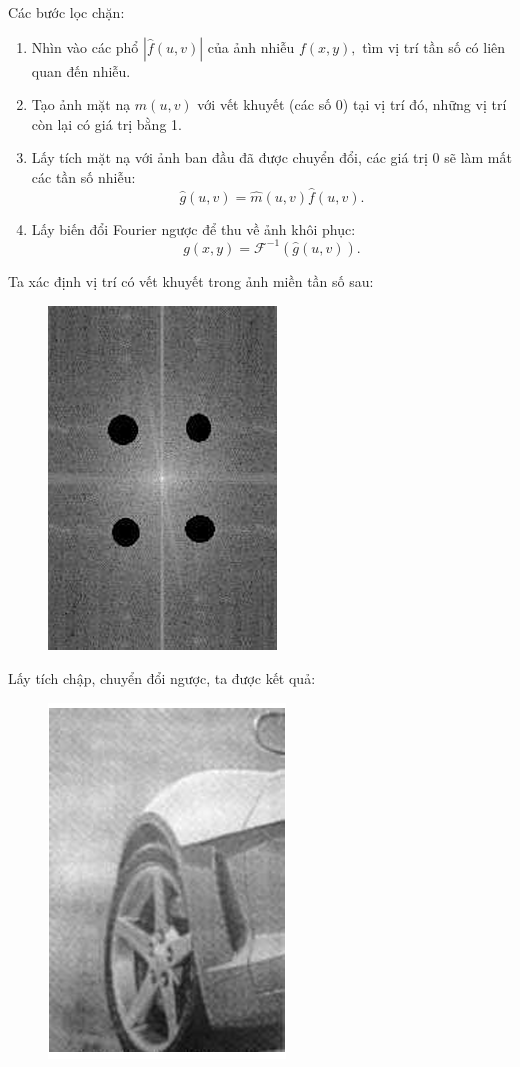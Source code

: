 \documentclass[12pt,a4paper]{report}
\numberwithin{equation}{section}
\theoremstyle{definition} %
\begin{document}
Các bước lọc chặn:
\begin{enumerate}
    \item Nhìn vào các phổ $|\hat{f}(u,v)|$ của ảnh nhiễu $f(x,y),$ tìm vị trí tần số có liên quan đến nhiễu.
    \item Tạo ảnh mặt nạ $\widehat{m}(u,v)$ với vết khuyết (các số 0) tại vị trí đó, những vị trí còn lại có giá trị bằng 1.
    \item Lấy tích mặt nạ với ảnh ban đầu đã được chuyển đổi, các giá trị 0 sẽ làm mất các tần số nhiễu:
    $$\hat{g}(u,v)=\widehat{m}(u,v)\hat{f}(u,v).$$
    \item Lấy biến đổi Fourier ngược để thu về ảnh khôi phục:
    $$g(x,y)=\mathcal{F}^{-1}\left(\hat{g}(u,v)\right).$$

   
    
\end{enumerate}
 Ta xác định vị trí có vết khuyết trong ảnh miền tần số sau:
\begin{figure}[H]
\centering
\includegraphics[width=0.4\linewidth]{img/locChan/Anhdiemchamden.png} 
\caption{}
\label{fig143}
\end{figure}

    Lấy tích chập, chuyển đổi ngược, ta được kết quả:
\begin{figure}[H]
\centering
\includegraphics[width=0.4\linewidth]{img/locChan/AnhXehoisaulocchan.png}
\caption{}
\label{fig144}
\end{figure}
\end{document}
